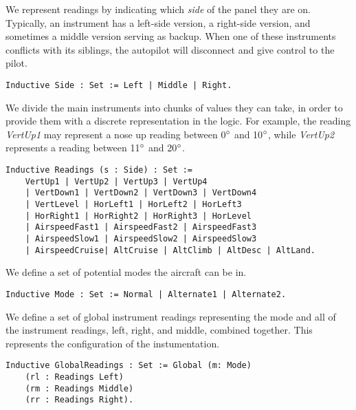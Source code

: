 We represent readings by indicating which \emph{side} of the panel they are on. Typically, an instrument has a left-side version, a right-side version, and sometimes a middle version serving as backup. When one of these instruments conflicts with its siblings, the autopilot will disconnect and give control to the pilot.


\begin{tcolorbox}
	\begin{lstlisting}[language=Coq]
	Inductive Side : Set := Left | Middle | Right.
	\end{lstlisting}	
	
\end{tcolorbox}

We divide the main instruments into chunks of values they can take, in order to provide them with a discrete representation in the logic. For example, the reading \emph{VertUp1} may represent a nose up reading between 0$\degree$ and 10$\degree$, while \emph{VertUp2} represents a reading between 11$\degree$ and 20$\degree$.

\begin{tcolorbox}
	\begin{lstlisting}[language=Coq]
	Inductive Readings (s : Side) : Set := 
	VertUp1 | VertUp2 | VertUp3 | VertUp4 
	| VertDown1 | VertDown2 | VertDown3 | VertDown4 
	| VertLevel | HorLeft1 | HorLeft2 | HorLeft3 
	| HorRight1 | HorRight2 | HorRight3 | HorLevel
	| AirspeedFast1 | AirspeedFast2 | AirspeedFast3 
	| AirspeedSlow1 | AirspeedSlow2 | AirspeedSlow3 
	| AirspeedCruise| AltCruise | AltClimb | AltDesc | AltLand.
	\end{lstlisting}	
	
\end{tcolorbox}

We define a set of potential modes the aircraft can be in.

\begin{tcolorbox}
	\begin{lstlisting}[language=Coq]
	Inductive Mode : Set := Normal | Alternate1 | Alternate2.
	\end{lstlisting}
\end{tcolorbox}

We define a set of global instrument readings representing the mode and all of the instrument readings, left, right, and middle, combined together. This represents the configuration of the instumentation.


\begin{tcolorbox}
	\begin{lstlisting}[language=Coq]
	Inductive GlobalReadings : Set := Global (m: Mode) 
	(rl : Readings Left) 
	(rm : Readings Middle) 
	(rr : Readings Right). 
	\end{lstlisting}
\end{tcolorbox}

